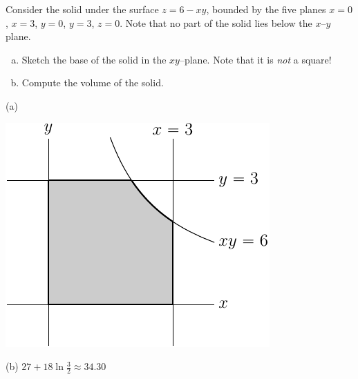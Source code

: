 \begin{question}[M200 2003D] %
Consider the solid under the surface $z=6-xy$, bounded by
the five planes $x=0$, $x=3$, $y=0$, $y=3$, $z=0$. Note that no part of
the solid lies below the $x$--$y$ plane.
\begin{enumerate}[(a)]
\item
Sketch the base of the solid in the $xy$--plane. Note that
it is \emph{not} a square!
\item
Compute the volume of the solid.
\end{enumerate}
\end{question}


\begin{answer}
(a)
\begin{center}
     \includegraphics{fig/OE03DQ6a.pdf}
\end{center}

(b)
$27+18\ln\frac{3}{2}\approx 34.30$
\end{answer}

